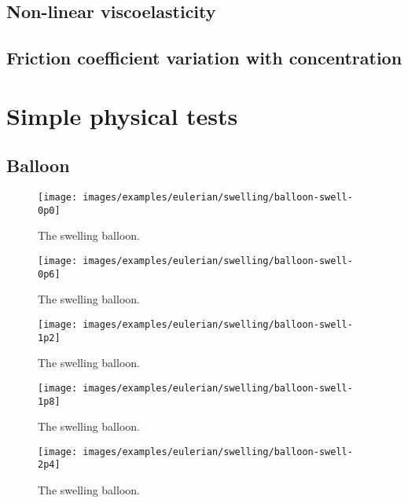\subsection{Non-linear viscoelasticity}
\label{non-linear-viscoelasticity}

\subsection{Friction coefficient variation with concentration}
\label{variable-friction-coefficient}

\section{Simple physical tests}
\label{simple-physics}

\subsection{Balloon}
\label{balloon}

\begin{figure}
\centering
{\texttt{[image: images/examples/eulerian/swelling/balloon-swell-0p0]}}
\caption{The swelling balloon.} 
\label{swelling-balloon-image-0}
\end{figure}

\begin{figure}
\centering
{\texttt{[image: images/examples/eulerian/swelling/balloon-swell-0p6]}}
\caption{The swelling balloon.} 
\label{swelling-balloon-image-1}
\end{figure}

\begin{figure}
\centering
{\texttt{[image: images/examples/eulerian/swelling/balloon-swell-1p2]}}
\caption{The swelling balloon.} 
\label{swelling-balloon-image-2}
\end{figure}

\begin{figure}
\centering
{\texttt{[image: images/examples/eulerian/swelling/balloon-swell-1p8]}}
\caption{The swelling balloon.} 
\label{swelling-balloon-image-3}
\end{figure}

\begin{figure}
\centering
{\texttt{[image: images/examples/eulerian/swelling/balloon-swell-2p4]}}
\caption{The swelling balloon.} 
\label{swelling-balloon-image-4}
\end{figure}

